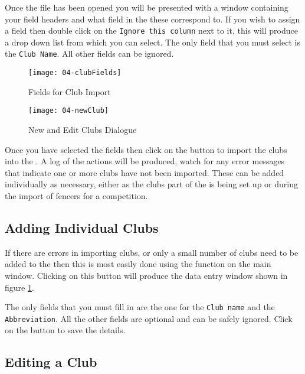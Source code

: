 \documentclass[a4paper,11pt]{memoir}
\begin{document}
Once the file has been opened you will be presented with a window containing your field headers and what field in the  these correspond to. If you wish to assign a field then double click on the \texttt{Ignore this column} next to it, this will produce a drop down list from which you can select. The only field that you must select is the \texttt{Club Name}. All other fields can be ignored.

\begin{figure}[!ht]
 \begin{minipage}{0.4\textwidth}
  \centering
  \texttt{[image: 04-clubFields]}
  \caption{Fields for Club Import} \label{fig:04-clubFields}
 \end{minipage}
 \hfill
 \begin{minipage}{0.4\textwidth}
  \centering
  \texttt{[image: 04-newClub]}
  \caption{New and Edit Clubs Dialogue} \label{fig:04-newClub}
 \end{minipage}
\end{figure}

Once you have selected the fields then click on the  button to import the clubs into the . A log of the actions will be produced, watch for any error messages that indicate one or more clubs have not been imported. These can be added individually as necessary, either as the clubs part of the  is being set up or during the import of fencers for a competition.

\subsection{Adding Individual Clubs}
If there are errors in importing clubs, or only a small number of clubs need to be added to the  then this is most easily done using the  function on the  main window. Clicking on this button will produce the data entry window shown in figure \ref{fig:04-newClub}.

The only fields that you must fill in are the one for the \texttt{Club name} and the \texttt{Abbreviation}. All the other fields are optional and can be safely ignored. Click on the  button to save the details.

\subsection{Editing a Club}
\end{document}
